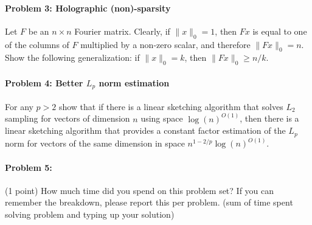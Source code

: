 \documentclass[12pt]{article}
\begin{document}
\paragraph{Problem 3: Holographic (non)-sparsity} Let $F$ be an $n \times n$ Fourier matrix. Clearly, if  $\|x\|_0=1$, then $Fx$ is equal to one of the columns of $F$ multiplied by a non-zero scalar, and therefore $\|Fx\|_0=n$. Show the following generalization: if $\|x\|_0=k$, then $\|Fx\|_0 \ge n/k$. 

\paragraph{Problem 4: Better $L_p$ norm estimation} For any $p>2$ show that if there is a linear sketching algorithm that solves $L_2$ sampling for vectors of dimension $n$ using space $\log(n)^{O(1)}$, then there is a linear sketching algorithm that provides a constant factor estimation of the $L_p$ norm for vectors of the same dimension in space $n^{1-2/p} \log(n)^{O(1)}$. 

\paragraph{Problem 5:} (1 point) How much time did you spend on this problem set? If you can remember the breakdown, please report this per problem. (sum of time spent solving problem and typing up your solution)
\end{document}

